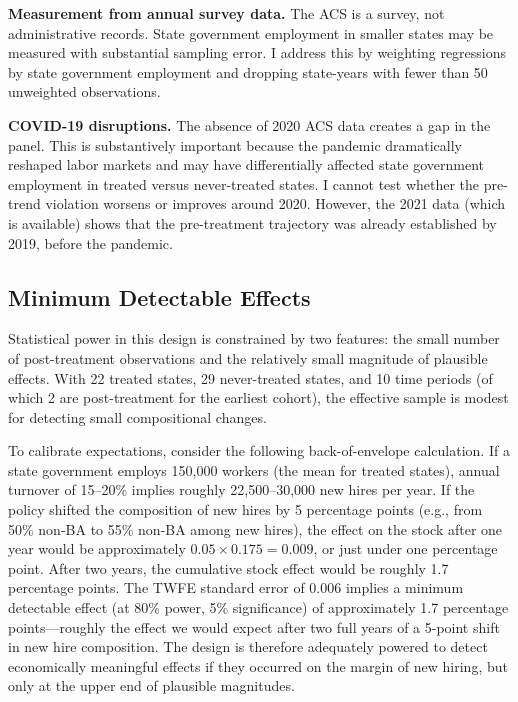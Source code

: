 \documentclass[12pt]{article}
\begin{document}
\textbf{Measurement from annual survey data.} The ACS is a survey, not administrative records. State government employment in smaller states may be measured with substantial sampling error. I address this by weighting regressions by state government employment and dropping state-years with fewer than 50 unweighted observations.

\textbf{COVID-19 disruptions.} The absence of 2020 ACS data creates a gap in the panel. This is substantively important because the pandemic dramatically reshaped labor markets and may have differentially affected state government employment in treated versus never-treated states. I cannot test whether the pre-trend violation worsens or improves around 2020. However, the 2021 data (which is available) shows that the pre-treatment trajectory was already established by 2019, before the pandemic.

\subsection{Minimum Detectable Effects}

Statistical power in this design is constrained by two features: the small number of post-treatment observations and the relatively small magnitude of plausible effects. With 22 treated states, 29 never-treated states, and 10 time periods (of which 2 are post-treatment for the earliest cohort), the effective sample is modest for detecting small compositional changes.

To calibrate expectations, consider the following back-of-envelope calculation. If a state government employs 150,000 workers (the mean for treated states), annual turnover of 15--20\% implies roughly 22,500--30,000 new hires per year. If the policy shifted the composition of new hires by 5 percentage points (e.g., from 50\% non-BA to 55\% non-BA among new hires), the effect on the stock after one year would be approximately $0.05 \times 0.175 = 0.009$, or just under one percentage point. After two years, the cumulative stock effect would be roughly 1.7 percentage points. The TWFE standard error of 0.006 implies a minimum detectable effect (at 80\% power, 5\% significance) of approximately 1.7 percentage points---roughly the effect we would expect after two full years of a 5-point shift in new hire composition. The design is therefore adequately powered to detect economically meaningful effects if they occurred on the margin of new hiring, but only at the upper end of plausible magnitudes.
\end{document}
